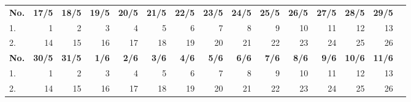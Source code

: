 \documentclass{article}
\begin{document}
\begin{table}[H]
    \centering
    \begin{tabularx}{\textwidth}{| X | r | r | r | r | r | r | r | r | r | r | r | r | r | r |}
        \Xhline{2pt}
        \textbf{No.} & \textbf{17/5} & \textbf{18/5} & \textbf{19/5} & \textbf{20/5} & \textbf{21/5} & \textbf{22/5} & \textbf{23/5} & \textbf{24/5} & \textbf{25/5} & \textbf{26/5} & \textbf{27/5} & \textbf{28/5} & \textbf{29/5} \\
        \Xhline{2pt}
        1. & 1 & 2 & 3 & 4 & 5 & 6 & 7 & 8 & 9 & 10 & 11 & 12 & 13 \\
        \hline
        2. & 14 & 15 & 16 & 17 & 18 & 19 & 20 & 21 & 22 & 23 & 24 & 25 & 26 \\
        \Xhline{2pt}
        \textbf{No.} & \textbf{30/5} & \textbf{31/5} & \textbf{ 1/6} & \textbf{ 2/6} & \textbf{ 3/6} & \textbf{ 4/6} & \textbf{ 5/6} & \textbf{ 6/6} & \textbf{ 7/6} & \textbf{ 8/6} & \textbf{ 9/6} & \textbf{10/6} & \textbf{11/6} \\
        \Xhline{2pt}
        1. & 1 & 2 & 3 & 4 & 5 & 6 & 7 & 8 & 9 & 10 & 11 & 12 & 13 \\
        \hline
        2. & 14 & 15 & 16 & 17 & 18 & 19 & 20 & 21 & 22 & 23 & 24 & 25 & 26 \\
        \hline
    \end{tabularx}
\end{table}

\clearpage
\end{document}
